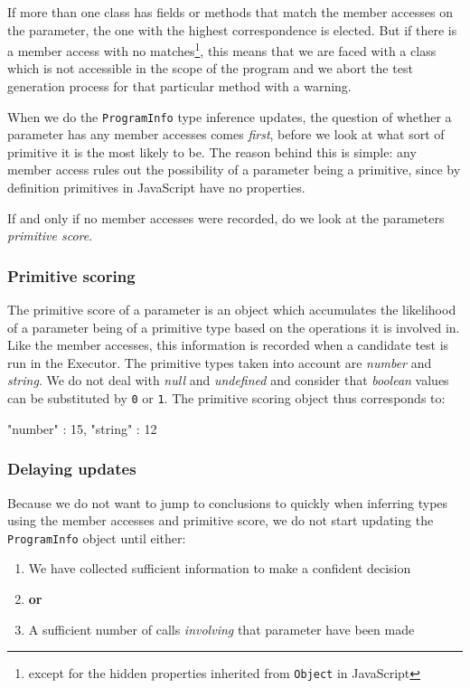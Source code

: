 If more than one class has fields or methods that match the member accesses on the parameter, the one with the highest correspondence is elected. But if there is a member access with no matches\footnote{except for the hidden properties inherited from \texttt{Object} in JavaScript}, this means that we are faced with a class which is not accessible in the scope of the program and we abort the test generation process for that particular method with a warning.

When we do the \texttt{ProgramInfo} type inference updates, the question of whether a parameter has any member accesses comes \emph{first}, before we look at what sort of primitive it is the most likely to be. The reason behind this is simple: any member access rules out the possibility of a parameter being a primitive, since by definition primitives in JavaScript have no properties.

If and only if no member accesses were recorded, do we look at the parameters \emph{primitive score}.

\subsubsection{Primitive scoring}
The primitive score of a parameter is an object which accumulates the likelihood of a parameter being of a primitive type based on the operations it is involved in. Like the member accesses, this information is recorded when a candidate test is run in the \textsf{Executor}. The primitive types taken into account are \emph{number} and \emph{string}. We do not deal with \emph{null} and \emph{undefined} and consider that \emph{boolean} values can be substituted by \texttt{0} or \texttt{1}. The primitive scoring object thus corresponds to:

\begin{code}[caption=Primitive scoring, label=primitivescore]
   {
      "number" : 15,
      "string" : 12
   }
\end{code}

\subsubsection{Delaying updates}
Because we do not want to jump to conclusions to quickly when inferring types using the member accesses and primitive score, we do not start updating the \texttt{ProgramInfo} object until either:

\begin{enumerate}
   \item We have collected sufficient information to make a confident decision
   \item[] \textbf{or}
   \item A sufficient number of calls \emph{involving} that parameter have been made
\end{enumerate}

